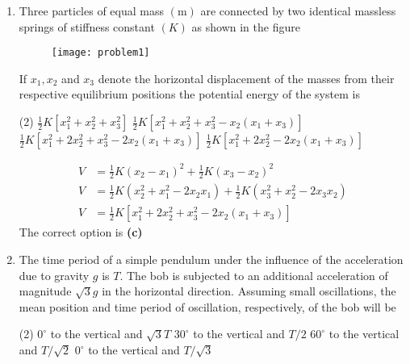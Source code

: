 \begin{enumerate}
		\item Three particles of equal mass $(\mathrm{m})$ are connected by two identical massless springs of stiffness constant $(K)$ as shown in the figure\\
		\begin{figure}[H]
			\centering
			\texttt{[image: problem1]}
		\end{figure}
		If $x_{1}, x_{2}$ and $x_{3}$ denote the horizontal displacement of the masses from their respective equilibrium positions the potential energy of the system is
		{}
	\begin{tasks}(2)
		\task[\textbf{A.}] $\frac{1}{2} K\left[x_{1}^{2}+x_{2}^{2}+x_{3}^{2}\right]$
		\task[\textbf{B.}]$\frac{1}{2} K\left[x_{1}^{2}+x_{2}^{2}+x_{3}^{2}-x_{2}\left(x_{1}+x_{3}\right)\right]$
		\task[\textbf{C.}]$\frac{1}{2} K\left[x_{1}^{2}+2 x_{2}^{2}+x_{3}^{2}-2 x_{2}\left(x_{1}+x_{3}\right)\right]$
		\task[\textbf{D.}]$\frac{1}{2} K\left[x_{1}^{2}+2 x_{2}^{2}-2 x_{2}\left(x_{1}+x_{3}\right)\right]$
	\end{tasks}
	\begin{answer}
		\begin{align*}
		V&=\frac{1}{2} K\left(x_{2}-x_{1}\right)^{2}+\frac{1}{2} K\left(x_{3}-x_{2}\right)^{2}\\
		V&=\frac{1}{2} K\left(x_{2}^{2}+x_{1}^{2}-2 x_{2} x_{1}\right)+\frac{1}{2} K\left(x_{3}^{2}+x_{2}^{2}-2 x_{3} x_{2}\right)\\
		V&=\frac{1}{2} K\left[x_{1}^{2}+2 x_{2}^{2}+x_{3}^{2}-2 x_{2}\left(x_{1}+x_{3}\right)\right]
		\end{align*}
		The correct option is \textbf{(c)}
	\end{answer}
		\item The time period of a simple pendulum under the influence of the acceleration due to gravity $g$ is $T$. The bob is subjected to an additional acceleration of magnitude $\sqrt{3} g$ in the horizontal direction. Assuming small oscillations, the mean position and time period of oscillation, respectively, of the bob will be
		{}
	\begin{tasks}(2)
		\task[\textbf{A.}] $0^{\circ}$ to the vertical and $\sqrt{3} T$
		\task[\textbf{B.}]$30^{\circ}$ to the vertical and $T / 2$
		\task[\textbf{C.}]$60^{\circ}$ to the vertical and $T / \sqrt{2}$
		\task[\textbf{D.}]$0^{\circ}$ to the vertical and $T / \sqrt{3}$
	\end{tasks}
	\begin{answer}
		\begin{align*}

\end{align*}
\end{answer}
\end{enumerate}
